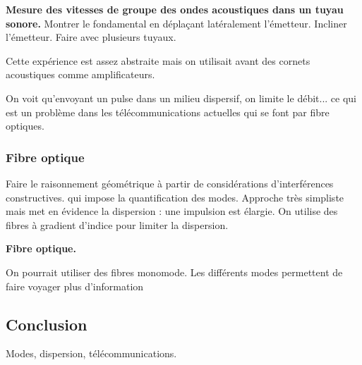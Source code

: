 \begin{experience}
\textbf{Mesure des vitesses de groupe des ondes acoustiques dans un tuyau sonore.}
Montrer le fondamental en déplaçant latéralement l'émetteur.
Incliner l'émetteur.
Faire avec plusieurs tuyaux.
\end{experience}

Cette expérience est assez abstraite mais on utilisait avant des cornets acoustiques comme amplificateurs.

\begin{transition}
On voit qu'envoyant un pulse dans un milieu dispersif, on limite le débit... ce qui est un problème dans les télécommunications actuelles qui se font par fibre optiques. 
\end{transition}

\subsubsection{Fibre optique}

Faire le raisonnement géométrique à partir de considérations d'interférences constructives. qui impose la quantification des modes.
Approche très simpliste mais met en évidence la dispersion : une impulsion est élargie.
On utilise des fibres à gradient d'indice pour limiter la dispersion.

\begin{slide}
\textbf{Fibre optique.}
\end{slide}

On pourrait utiliser des fibres monomode.
Les différents modes permettent de faire voyager plus d'information

\subsection*{Conclusion}

Modes, dispersion, télécommunications.

\newpage